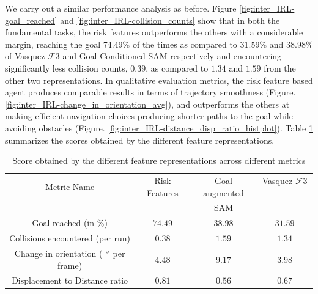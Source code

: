 We carry out a similar performance analysis as before. Figure \ref{fig:inter_IRL-goal_reached} and \ref{fig:inter_IRL-collision_counts} show that in both the fundamental tasks, the risk features outperforms the others with a considerable margin, reaching the goal $74.49\%$ of the times as compared to $31.59\%$ and $38.98\%$ of Vasquez $\mathcal{F}3$ and Goal Conditioned SAM respectively and encountering significantly less collision counts, $0.39$, as compared to $1.34$ and $1.59$ from the other two representations. In qualitative evaluation metrics, the risk feature based agent produces comparable results in terms of trajectory smoothness (Figure. \ref{fig:inter_IRL-change_in_orientation_avg}), and outperforms the others at making efficient navigation choices producing shorter paths to the goal while avoiding obstacles (Figure. \ref{fig:inter_IRL-distance_disp_ratio_histplot}). Table \ref{tab:inter_irl_numerical_comparison} summarizes the scores obtained by the different feature representations.
\begin{table}[htbp]
	\begin{center}
		\renewcommand{\arraystretch}{1.3}
		\begin{tabular}{|c|c|c|c|}
			\hline
			Metric Name & Risk Features & Goal augmented  & Vasquez $\mathcal{F}3$ \ \\
			  &   & SAM  &  \\
			\hline
			Goal reached (in $\%$) & $74.49$ & $38.98$ & $31.59$ \\
			Collisions encountered (per run) & $0.38$ & $1.59$ & $1.34$ \\
			Change in orientation ( $\degree$ per frame) & $4.48$ & $9.17$ &  $3.98$\\
			Displacement to Distance ratio & $0.81$ &  $0.56$ & $0.67$\\
			\hline
		\end{tabular}
	\end{center}
	\caption{Score obtained by the different feature representations across different metrics}
	\label{tab:inter_irl_numerical_comparison}
\end{table}\\

